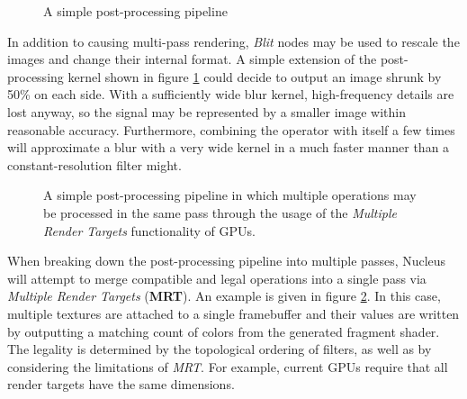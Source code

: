\begin{figure}[h!]
  \centering
    \caption[Simple post-processing]{A simple post-processing pipeline}
  \label{fig:SimplePostProc}
\end{figure}

In addition to causing multi-pass rendering, \emph{Blit} nodes may be used to rescale the images and change their internal format. A simple extension of the post-processing kernel shown in figure \ref{fig:SimplePostProc} could decide to output an image shrunk by 50\% on each side. With a sufficiently wide blur kernel, high-frequency details are lost anyway, so the signal may be represented by a smaller image within reasonable accuracy. Furthermore, combining the operator with itself a few times will approximate a blur with a very wide kernel in a much faster manner than a constant-resolution filter might.

\begin{figure}[h!]
  \centering
    \caption[MRT usage in post-processing]{A simple post-processing pipeline in which multiple operations may be processed in the same pass through the usage of the \emph{Multiple Render Targets} functionality of GPUs.}
  \label{fig:PostProcMRT}
\end{figure}

When breaking down the post-processing pipeline into multiple passes, Nucleus will attempt to merge compatible and legal operations into a single pass via \emph{Multiple Render Targets} (\textbf{MRT}). An example is given in figure \ref{fig:PostProcMRT}. In this case, multiple textures are attached to a single framebuffer and their values are written by outputting a matching count of colors from the generated fragment shader. The legality is determined by the topological ordering of filters, as well as by considering the limitations of \emph{MRT}. For example, current GPUs require that all render targets have the same dimensions.


